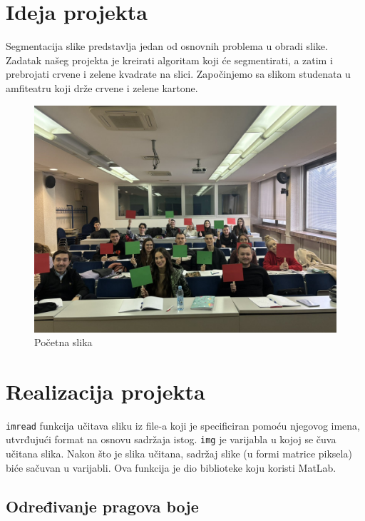 \documentclass[a4paper,12pt]{article}
\begin{document}
\section{Ideja projekta}
Segmentacija slike predstavlja jedan od osnovnih problema u obradi slike.
Zadatak našeg projekta je kreirati algoritam koji će segmentirati, a zatim i prebrojati crvene i zelene kvadrate na slici.
Započinjemo sa slikom studenata u amfiteatru koji drže crvene i zelene kartone.
\begin{figure}[h]
    \centering
    \includegraphics[width=\textwidth]{../img/studenti.jpg}
    \caption{Početna slika}
    \label{fig:example}
\end{figure}
\newpage
\section{Realizacija projekta}

\texttt{imread} funkcija učitava sliku iz file-a koji je specificiran pomoću njegovog imena, utvrđujući format  na osnovu sadržaja istog. 
\texttt{img} je varijabla u kojoj se čuva učitana slika. 
Nakon što je slika učitana, sadržaj slike (u formi matrice piksela) biće sačuvan u varijabli. Ova funkcija je dio biblioteke koju koristi MatLab.\\
\subsection{Određivanje pragova boje}

\end{document}
